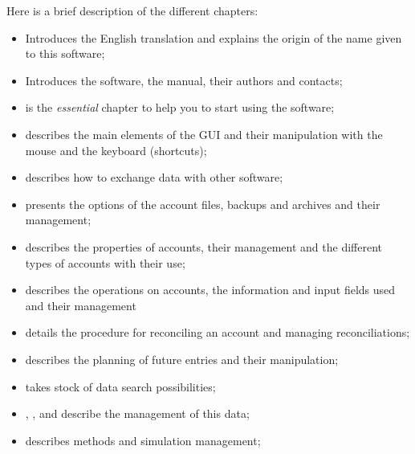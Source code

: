 
Here is a brief description of the different chapters:

\begin{itemize}

\item {} Introduces the English translation and explains the origin of the name given to this software;

\item {} Introduces the software, the manual, their authors and contacts;

\item {} is the \emph{essential} chapter to help you to start using the software;

\item {} describes the main elements of the GUI and their manipulation with the mouse and the keyboard (shortcuts);

\item {} describes how to exchange data with other software;

\item {} presents the options of the account files, backups and archives and their management;

\item {} describes the properties of accounts, their management and the different types of accounts with their use;

\item {} describes the operations on accounts, the information and input fields used and their management

\item {} details the procedure for reconciling an account and managing reconciliations;

\item {} describes the planning of future entries and their manipulation;

\item {} takes stock of data search possibilities;

\item {}, ,  and  describe the management of this data;

\item {} describes methods and simulation management;


\end{itemize}
